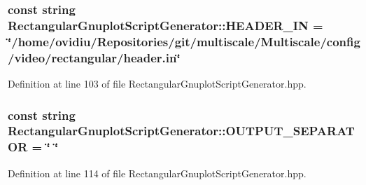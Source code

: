 \hypertarget{classmultiscale_1_1video_1_1RectangularGnuplotScriptGenerator_afeced106138e618bb292826093205023}{
\subsubsection[{\-H\-E\-A\-D\-E\-R\-\_\-\-I\-N}]{\setlength{\rightskip}{0pt plus 5cm}const string {\bf \-Rectangular\-Gnuplot\-Script\-Generator\-::\-H\-E\-A\-D\-E\-R\-\_\-\-I\-N} = \char`\"{}/home/ovidiu/\-Repositories/git/multiscale/\-Multiscale/config/video/rectangular/header.\-in\char`\"{}}}\label{classmultiscale_1_1video_1_1RectangularGnuplotScriptGenerator_afeced106138e618bb292826093205023}


\-Definition at line 103 of file \-Rectangular\-Gnuplot\-Script\-Generator.\-hpp.

\hypertarget{classmultiscale_1_1video_1_1RectangularGnuplotScriptGenerator_a8e42e0b2f41ffd1115f6123d45195ed0}{
\subsubsection[{\-O\-U\-T\-P\-U\-T\-\_\-\-S\-E\-P\-A\-R\-A\-T\-O\-R}]{\setlength{\rightskip}{0pt plus 5cm}const string {\bf \-Rectangular\-Gnuplot\-Script\-Generator\-::\-O\-U\-T\-P\-U\-T\-\_\-\-S\-E\-P\-A\-R\-A\-T\-O\-R} = \char`\"{} \char`\"{}}}\label{classmultiscale_1_1video_1_1RectangularGnuplotScriptGenerator_a8e42e0b2f41ffd1115f6123d45195ed0}


\-Definition at line 114 of file \-Rectangular\-Gnuplot\-Script\-Generator.\-hpp.

